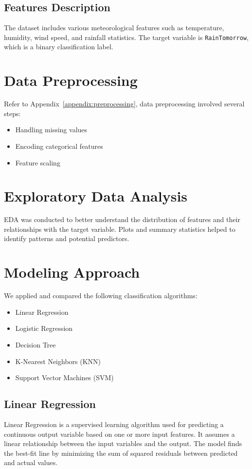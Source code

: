 \documentclass[12pt]{article}
\begin{document}
\subsection{Features Description}
The dataset includes various meteorological features such as temperature, humidity, wind speed, and rainfall statistics. The target variable is \texttt{RainTomorrow}, which is a binary classification label.

\section{Data Preprocessing}
Refer to Appendix~\ref{appendix:preprocessing}, data preprocessing involved several steps:
\begin{itemize}
    \item Handling missing values
    \item Encoding categorical features
    \item Feature scaling
\end{itemize}

\section{Exploratory Data Analysis}
EDA was conducted to better understand the distribution of features and their relationships with the target variable. Plots and summary statistics helped to identify patterns and potential predictors.

\section{Modeling Approach}
We applied and compared the following classification algorithms:
\begin{itemize}
    \item Linear Regression
    \item Logistic Regression
    \item Decision Tree
    \item K-Nearest Neighbors (KNN)
    \item Support Vector Machines (SVM)
\end{itemize}

\subsection{Linear Regression}
Linear Regression is a supervised learning algorithm used for predicting a continuous output variable based on one or more input features. It assumes a linear relationship between the input variables and the output. The model finds the best-fit line by minimizing the sum of squared residuals between predicted and actual values.
\end{document}
